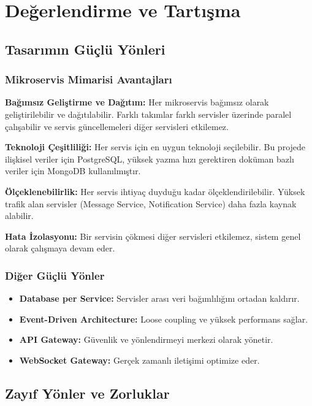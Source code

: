 \chapter{Değerlendirme ve Tartışma}

\section{Tasarımın Güçlü Yönleri}

\subsection{Mikroservis Mimarisi Avantajları}
\textbf{Bağımsız Geliştirme ve Dağıtım:} Her mikroservis bağımsız olarak geliştirilebilir ve dağıtılabilir. Farklı takımlar farklı servisler üzerinde paralel çalışabilir ve servis güncellemeleri diğer servisleri etkilemez.

\textbf{Teknoloji Çeşitliliği:} Her servis için en uygun teknoloji seçilebilir. Bu projede ilişkisel veriler için PostgreSQL, yüksek yazma hızı gerektiren doküman bazlı veriler için MongoDB kullanılmıştır.

\textbf{Ölçeklenebilirlik:} Her servis ihtiyaç duyduğu kadar ölçeklendirilebilir. Yüksek trafik alan servisler (Message Service, Notification Service) daha fazla kaynak alabilir.

\textbf{Hata İzolasyonu:} Bir servisin çökmesi diğer servisleri etkilemez, sistem genel olarak çalışmaya devam eder.

\subsection{Diğer Güçlü Yönler}
\begin{itemize}
    \item \textbf{Database per Service:} Servisler arası veri bağımlılığını ortadan kaldırır.
    \item \textbf{Event-Driven Architecture:} Loose coupling ve yüksek performans sağlar.
    \item \textbf{API Gateway:} Güvenlik ve yönlendirmeyi merkezi olarak yönetir.
    \item \textbf{WebSocket Gateway:} Gerçek zamanlı iletişimi optimize eder.
\end{itemize}

\section{Zayıf Yönler ve Zorluklar}

